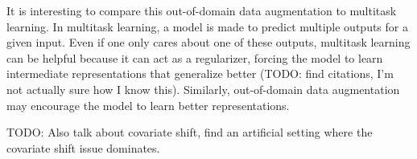 \documentclass[11pt,letterpaper]{article}
\newcommand{\regex}{\textsc{Regex}\xspace}
\begin{document}
It is interesting to compare this out-of-domain data augmentation
to multitask learning.
In multitask learning, a model is made to predict multiple outputs for a given input.
Even if one only cares about one of these outputs,
multitask learning can be helpful because it can act as a regularizer,
forcing the model to learn intermediate representations that generalize
better (TODO: find citations, I'm not actually sure how I know this).
Similarly, out-of-domain data augmentation may encourage
the model to learn better representations.

TODO: Also talk about covariate shift, find an artificial
setting where the covariate shift issue dominates.

%
%
%
\end{document}
